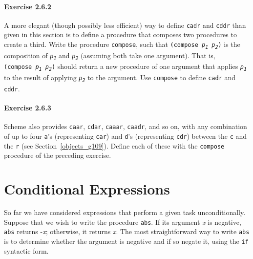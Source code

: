 \paragraph{Exercise \label{start_g27}2.6.2}


\label{start_s92}A more elegant (though possibly less efficient) way to define \label{start_s93}\texttt{cadr}
and \label{start_s94}\texttt{cddr} than given in this
section is to define a procedure that composes two procedures to create
a third.
Write the procedure \label{start_s95}\texttt{compose}, such that
\texttt{(compose \textit{p\textsubscript{1}} \textit{p\textsubscript{2}})} is the composition of
\texttt{\textit{p\textsubscript{1}}} and \texttt{\textit{p\textsubscript{2}}} (assuming both take one argument).
That is, \texttt{(compose \textit{p\textsubscript{1}} \textit{p\textsubscript{2}})} should return a new
procedure of one argument that applies \texttt{\textit{p\textsubscript{1}}} to the result of
applying \texttt{\textit{p\textsubscript{2}}} to the argument.
Use \texttt{compose} to define \texttt{cadr} and \texttt{cddr}.




\paragraph{Exercise \label{start_g28}2.6.3}


\label{start_s96}Scheme also provides
\label{start_s97}\texttt{caar}, \texttt{cdar}, \texttt{caaar}, \texttt{caadr},
and so on, with any combination of up to four \texttt{a}'s (representing
\texttt{car}) and \texttt{d}'s (representing \texttt{cdr}) between the \texttt{c}
and the \texttt{r} (see Section \ref{objects_g109}).
Define each of these with the \texttt{compose} procedure of the preceding
exercise.




\section{\label{start_g29}\label{start_h7}Conditional Expressions\label{start_SECTGSCONDITIONALS}}



So far we have considered expressions that perform a given task
unconditionally.
Suppose that we wish to write the procedure \label{start_s98}\texttt{abs}.
If its argument \textit{x} is negative, \texttt{abs}
returns -\textit{x}; otherwise, it returns \textit{x}.
The most straightforward way to write \texttt{abs} is to determine
whether the argument is negative and if so negate it, using the
\label{start_s99}\texttt{if} syntactic form.



